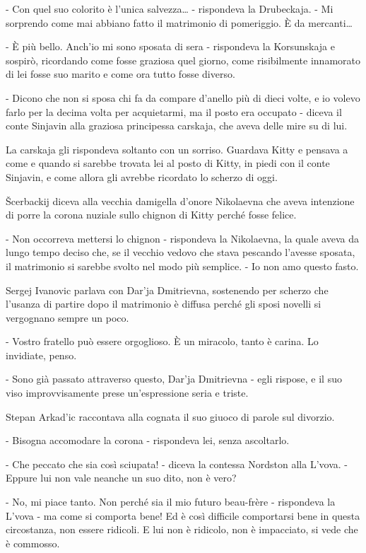 - Con quel suo colorito è l'unica salvezza\ldots{} - rispondeva la Drubeckaja. - Mi sorprendo come mai abbiano fatto il matrimonio di pomeriggio. È da mercanti\ldots{} 

- È più bello. Anch'io mi sono sposata di sera - rispondeva la Korsunskaja e sospirò, ricordando come fosse graziosa quel giorno, come risibilmente innamorato di lei fosse suo marito e come ora tutto fosse diverso. 

- Dicono che non si sposa chi fa da compare d'anello più di dieci volte, e io volevo farlo per la decima volta per acquietarmi, ma il posto era occupato - diceva il conte Sinjavin alla graziosa principessa carskaja, che aveva delle mire su di lui. 

La carskaja gli rispondeva soltanto con un sorriso. Guardava Kitty e pensava a come e quando si sarebbe trovata lei al posto di Kitty, in piedi con il conte Sinjavin, e come allora gli avrebbe ricordato lo scherzo di oggi. 

Šcerbackij diceva alla vecchia damigella d'onore Nikolaevna che aveva intenzione di porre la corona nuziale sullo chignon di Kitty perché fosse felice. 

- Non occorreva mettersi lo chignon - rispondeva la Nikolaevna, la quale aveva da lungo tempo deciso che, se il vecchio vedovo che stava pescando l'avesse sposata, il matrimonio si sarebbe svolto nel modo più semplice. - Io non amo questo fasto. 

Sergej Ivanovic parlava con Dar'ja Dmitrievna, sostenendo per scherzo che l'usanza di partire dopo il matrimonio è diffusa perché gli sposi novelli si vergognano sempre un poco. 

- Vostro fratello può essere orgoglioso. È un miracolo, tanto è carina. Lo invidiate, penso. 

- Sono già passato attraverso questo, Dar'ja Dmitrievna - egli rispose, e il suo viso improvvisamente prese un'espressione seria e triste. 

Stepan Arkad'ic raccontava alla cognata il suo giuoco di parole sul divorzio. 

- Bisogna accomodare la corona - rispondeva lei, senza ascoltarlo. 

- Che peccato che sia così sciupata! - diceva la contessa Nordston alla L'vova. - Eppure lui non vale neanche un suo dito, non è vero? 

- No, mi piace tanto. Non perché sia il mio futuro beau-frère - rispondeva la L'vova - ma come si comporta bene! Ed è così difficile comportarsi bene in questa circostanza, non essere ridicoli. E lui non è ridicolo, non è impacciato, si vede che è commosso. 

